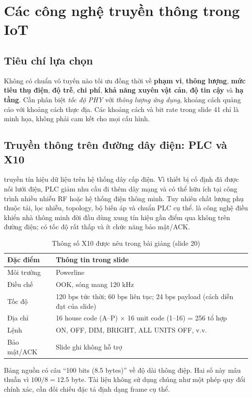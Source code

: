 \section{Các công nghệ truyền thông trong IoT}
\subsection{Tiêu chí lựa chọn}
Không có chuẩn vô tuyến nào tối ưu đồng thời về \textbf{phạm vi}, \textbf{thông lượng}, \textbf{mức tiêu thụ điện}, \textbf{độ trễ}, \textbf{chi phí}, \textbf{khả năng xuyên vật cản}, \textbf{độ tin cậy} và \textbf{hạ tầng}. Cần phân biệt \emph{tốc độ PHY} với \emph{thông lượng ứng dụng}, khoảng cách quảng cáo với khoảng cách thực địa. Các khoảng cách và bit rate trong slide 41 chỉ là minh họa, không phải cam kết cho mọi cấu hình.
\subsection{Truyền thông trên đường dây điện: PLC và X10}
 truyền tín hiệu dữ liệu trên hệ thống dây cấp điện. Vì thiết bị cố định đã được nối lưới điện, PLC giảm nhu cầu đi thêm dây mạng và có thể hữu ích tại công trình nhiều nhiễu RF hoặc hệ thống điện thông minh. Tuy nhiên chất lượng phụ thuộc tải, lọc nhiễu, topology, bộ biến áp và chuẩn PLC cụ thể.  là công nghệ điều khiển nhà thông minh đời đầu dùng xung tín hiệu gần điểm qua không trên đường điện; có tốc độ rất thấp và ít chức năng bảo mật/ACK.
\begin{table}[htbp]\centering\small\caption{Thông số X10 được nêu trong bài giảng (slide 20)}
\begin{tabularx}{\textwidth}{@{}p{45mm}X@{}}\toprule
Đặc điểm & Thông tin trong slide\\\midrule
Môi trường & Powerline\\
Điều chế & OOK, sóng mang 120 kHz\\
Tốc độ & 120 bps tức thời; 60 bps liên tục; 24 bps payload (cách diễn đạt của slide)\\
Địa chỉ & 16 house code (A--P) \(\times\) 16 unit code (1--16) = 256 tổ hợp\\
Lệnh & ON, OFF, DIM, BRIGHT, ALL UNITS OFF, v.v.\\
Bảo mật/ACK & Slide ghi không hỗ trợ\\\bottomrule
\end{tabularx}
\end{table}
\begin{note}Bảng nguồn có câu ``100 bits (8.5 bytes)'' về độ dài thông điệp. Hai số này mâu thuẫn vì \(100/8=12.5\) byte. Tài liệu không sử dụng chúng như một phép quy đổi chính xác, cần đối chiếu đặc tả định dạng frame cụ thể.\end{note}
